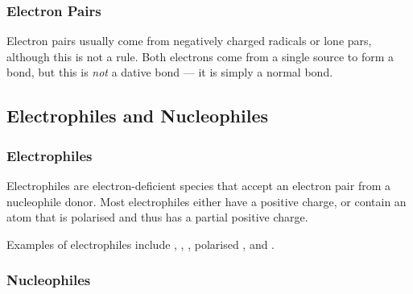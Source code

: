 

	\subsubsection{Electron Pairs}

		Electron pairs usually come from negatively charged radicals or lone pars, although this is not a rule.
		Both electrons come from a single source to form a bond, but this is \textit{not} a dative bond –– it is simply a normal
		bond.





\pagebreak %

\subsection{Electrophiles and Nucleophiles}
	\subsubsection{Electrophiles}

		Electrophiles are electron-deficient species that accept an electron pair from a nucleophile donor. Most electrophiles
		either have a positive charge, or contain an atom that is polarised and thus has a partial positive charge.

		Examples of electrophiles include , , , polarised , and .


	\subsubsection{Nucleophiles}

